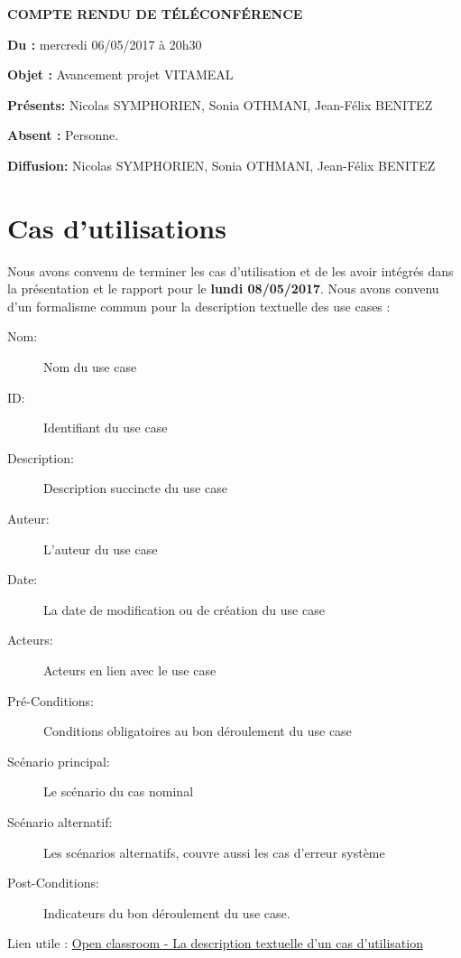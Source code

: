 \documentclass[11pt,a4paper,french,twoside,openright]{article}
\begin{document}
\pagestyle{fancy}

\begin{center}\bfseries\Huge
COMPTE RENDU DE TÉLÉCONFÉRENCE
\end{center}

\textbf{Du      :} mercredi 06/05/2017 à 20h30

\textbf{Objet   :} Avancement projet VITAMEAL

\textbf{Présents:} Nicolas SYMPHORIEN, Sonia OTHMANI, Jean-Félix BENITEZ

\textbf{Absent :} Personne.

\textbf{Diffusion:} Nicolas SYMPHORIEN, Sonia OTHMANI, Jean-Félix BENITEZ

\hrulefill

\section{Cas d'utilisations}

Nous avons convenu de terminer les cas d'utilisation et de les avoir intégrés
dans la présentation et le rapport pour le \textbf{lundi 08/05/2017}.
Nous avons convenu d'un formalisme commun pour la description textuelle des use
cases :

\begin{description}
\item[Nom:] Nom du use case
\item[ID:] Identifiant du use case
\item[Description:] Description succincte du use case
\item[Auteur:] L'auteur du use case
\item[Date:] La date de modification ou de création du use case
\item[Acteurs:] Acteurs en lien avec le use case
\item[Pré-Conditions:] Conditions obligatoires au bon déroulement du use case
\item[Scénario principal:] Le scénario du cas nominal
\item[Scénario alternatif:] Les scénarios alternatifs, couvre aussi les cas
d'erreur système
\item[Post-Conditions:] Indicateurs du bon déroulement du use case.
\end{description}

\noindent Lien utile :
\href{https://openclassrooms.com/courses/debutez-l-analyse-logicielle-avec-uml/la-description-textuelle-d-un-cas-d-utilisation}{Open
classroom - La description textuelle d’un cas d’utilisation}
\end{document}
